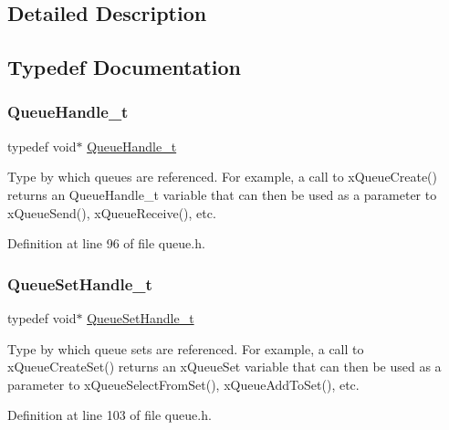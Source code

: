 \subsection{Detailed Description}


\subsection{Typedef Documentation}
\mbox{\label{group___queue_management_gaaf19d499892a4ce1409326ece00f5264}} 
\subsubsection{\texorpdfstring{Queue\+Handle\+\_\+t}{QueueHandle\_t}}
{\footnotesize\ttfamily typedef void$\ast$ \hyperlink{group___queue_management_gaaf19d499892a4ce1409326ece00f5264}{Queue\+Handle\+\_\+t}}

Type by which queues are referenced. For example, a call to x\+Queue\+Create() returns an Queue\+Handle\+\_\+t variable that can then be used as a parameter to x\+Queue\+Send(), x\+Queue\+Receive(), etc. 

Definition at line 96 of file queue.\+h.

\mbox{\label{group___queue_management_ga32a86d604e1706d72a5a4c62d8262f56}} 
\subsubsection{\texorpdfstring{Queue\+Set\+Handle\+\_\+t}{QueueSetHandle\_t}}
{\footnotesize\ttfamily typedef void$\ast$ \hyperlink{group___queue_management_ga32a86d604e1706d72a5a4c62d8262f56}{Queue\+Set\+Handle\+\_\+t}}

Type by which queue sets are referenced. For example, a call to x\+Queue\+Create\+Set() returns an x\+Queue\+Set variable that can then be used as a parameter to x\+Queue\+Select\+From\+Set(), x\+Queue\+Add\+To\+Set(), etc. 

Definition at line 103 of file queue.\+h.

